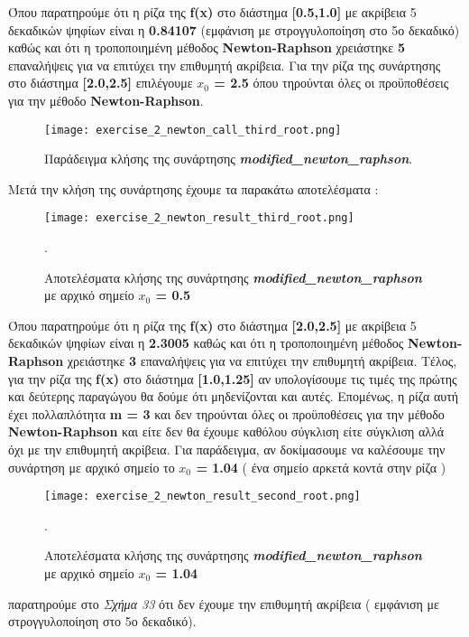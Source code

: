 \documentclass[First Project.tex]{subfiles}
\begin{document}
Όπου παρατηρούμε ότι η ρίζα της \textlatin{\textbf{f(x)}} στο διάστημα \textbf{[0.5,1.0]} με ακρίβεια 5 δεκαδικών ψηφίων 
είναι η \textbf{0.84107} (εμφάνιση με στρογγυλοποίηση στο 5ο δεκαδικό) καθώς και ότι η τροποποιημένη μέθοδος \textlatin{\textbf{Newton-Raphson}} χρειάστηκε \textbf{5} επαναλήψεις για να επιτύχει την 
επιθυμητή ακρίβεια. Για την ρίζα της συνάρτησης στο διάστημα \textbf{[2.0,2.5]} επιλέγουμε \textlatin{\textbf{ $x_{0}$ = 2.5}} όπου τηρούνται 
όλες οι προϋποθέσεις για την μέθοδο \textlatin{\textbf{Newton-Raphson}}. 
\begin{figure}[h!]
    \centering
    \captionsetup{justification=centering}
    \begin{center}
        \texttt{[image: exercise\_2\_newton\_call\_third\_root.png]}    
        \caption{Παράδειγμα κλήσης της συνάρτησης \textit{\textlatin{\textbf{modified\_newton\_raphson}}}.}
    \end{center}
\end{figure}

Μετά την κλήση της συνάρτησης έχουμε τα παρακάτω αποτελέσματα :

\begin{figure}[h!]
    \centering
    \captionsetup{justification=centering}
    \begin{center}
    \texttt{[image: exercise\_2\_newton\_result\_third\_root.png]}    
    \caption{ Αποτελέσματα κλήσης της συνάρτησης \textit{\textlatin{\textbf{modified\_newton\_raphson}}} \\ με αρχικό σημείο 
                \textlatin{\textbf{$x_{0}$ = 0.5}}}.
    \end{center}
\end{figure}

Όπου παρατηρούμε ότι η ρίζα της \textlatin{\textbf{f(x)}} στο διάστημα \textbf{[2.0,2.5]} με ακρίβεια 5 δεκαδικών ψηφίων 
είναι η \textbf{2.3005} καθώς και ότι η τροποποιημένη μέθοδος \textlatin{\textbf{Newton-Raphson}} χρειάστηκε \textbf{3} επαναλήψεις για να επιτύχει την 
επιθυμητή ακρίβεια. Τέλος, για την ρίζα της \textlatin{\textbf{f(x)}} στο διάστημα \textbf{[1.0,1.25]} αν υπολογίσουμε τις τιμές της πρώτης
και δεύτερης παραγώγου θα δούμε ότι μηδενίζονται και αυτές. Επομένως, η ρίζα αυτή έχει πολλαπλότητα \textlatin{\textbf{m = 3}} και δεν
τηρούνται όλες οι προϋποθέσεις για την μέθοδο \textlatin{\textbf{Newton-Raphson}} και είτε δεν θα έχουμε καθόλου σύγκλιση είτε 
σύγκλιση αλλά όχι με την επιθυμητή ακρίβεια. Για παράδειγμα, αν δοκίμασουμε να καλέσουμε την συνάρτηση με αρχικό σημείο το 
\textlatin{\textbf{ $x_{0}$ = 1.04}} ( ένα σημείο αρκετά κοντά στην ρίζα ) 
\begin{figure}[h!]
    \centering
    \captionsetup{justification=centering}
    \begin{center}
    \texttt{[image: exercise\_2\_newton\_result\_second\_root.png]}    
    \caption{ Αποτελέσματα κλήσης της συνάρτησης \textit{\textlatin{\textbf{modified\_newton\_raphson}}} \\ με αρχικό σημείο 
                \textlatin{\textbf{$x_{0}$ = 1.04}}}.
    \end{center}
\end{figure}
παρατηρούμε στο \textit{Σχήμα 33} ότι δεν έχουμε την επιθυμητή ακρίβεια ( εμφάνιση με στρογγυλοποίηση στο 5ο δεκαδικό).
\end{document}
